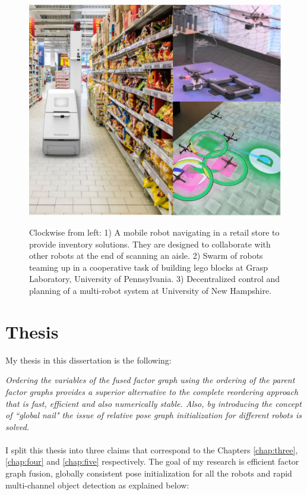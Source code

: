 \begin{figure}
\centering
\includegraphics[width=\textwidth]{Chapters/figures1/swarm_safe.eps}
\label{fig:intro}
\caption{Clockwise from left: 1) A mobile robot navigating in a retail store to provide inventory solutions. They are designed to collaborate with other robots at the end of scanning an aisle. 2) Swarm of robots teaming up in a cooperative task of building lego blocks at Grasp Laboratory, University of Pennsylvania. 3) Decentralized control and planning of a multi-robot system at University of New Hampshire.}
\end{figure}

\section{Thesis}

My thesis in this dissertation is the following:

\begin{center}
\textit{Ordering the variables of the fused factor graph using the ordering of the parent factor graphs provides a superior alternative to the complete reordering approach that is fast, efficient and also numerically stable. Also, by introducing the concept of ``global nail" the issue of relative pose graph initialization for different robots is solved.}
\end{center}

\paragraph{}
I split this thesis into three claims that correspond to the Chapters \ref{chap:three}, \ref{chap:four} and  \ref{chap:five} respectively. The goal of my research is efficient factor graph fusion, globally consistent pose initialization for all the robots and rapid multi-channel object detection as explained below:


